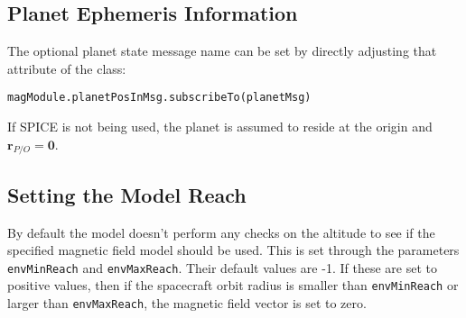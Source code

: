 \subsection{Planet Ephemeris Information}
The optional planet state message name can be set by directly adjusting that attribute of the class:
\begin{verbatim}
magModule.planetPosInMsg.subscribeTo(planetMsg)
\end{verbatim}
If SPICE is not being used, the planet is assumed to reside at the origin and $\bm r_{P/O} = \bm 0$.

\subsection{Setting the Model Reach}
By default the model doesn't perform any checks on the altitude to see if the specified magnetic field model should be used.  This is set through the parameters {\tt envMinReach} and {\tt envMaxReach}.  Their default values are -1.  If these are set to positive values, then if the spacecraft orbit radius is smaller than {\tt envMinReach} or larger than {\tt envMaxReach}, the magnetic field vector is set to zero.


